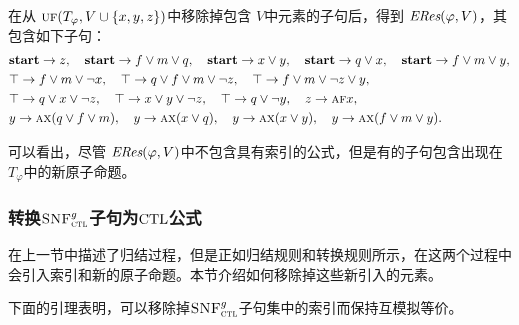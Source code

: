 \begin{example}
	在从 $\textsc{uf}(T_\varphi, V\cup \{x,y,z\})$中移除掉包含 $V$中元素的子句后，得到 $\emph{ERes}(\varphi,V)$，其包含如下子句：
	\begin{align*}%
		&\start\rto z, \quad \start \rto f\vee m \vee q, \quad  \start \rto x \vee y, \quad \start \rto q \vee x, \quad	\start \rto f\vee m \vee y, \\
		& \top \rto f \vee m \vee \neg x, \quad		\top \rto q \vee f \vee m\vee \neg z,
		\quad  	\top \rto f \vee m \vee \neg z \vee y,\\
		& \top \rto q \vee x\vee \neg z, \quad 	\top \rto x \vee y \vee \neg z, \quad 	\top \rto q\vee\neg y , \quad z \rto \ALL \FUTURE x, \\
		& y \rto \ALL\NEXT(q \vee f\vee m), \quad  y \rto \ALL\NEXT(x\vee q), \quad y \rto \ALL \NEXT(x\vee y),\quad 	y \rto \ALL\NEXT(f\vee m\vee y).
	\end{align*}
	
	可以看出，尽管 $\emph{ERes}(\varphi,V)$中不包含具有索引的公式，但是有的子句包含出现在 $T_\varphi$中的新原子命题。
\end{example}


\subsubsection{转换${\textsc{SNF}_{\textsc{ctl}}^g}$子句为$\textrm{CTL}$公式}
\label{cha5:subsubsec:remIndex}
在上一节中描述了归结过程，但是正如归结规则和转换规则所示，在这两个过程中会引入索引和新的原子命题。本节介绍如何移除掉这些新引入的元素。

下面的引理表明，可以移除掉${\textsc{SNF}_{\textsc{ctl}}^g}$子句集中的索引而保持互模拟等价。

